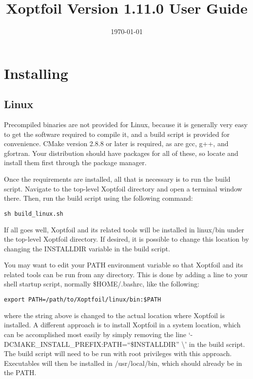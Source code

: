 \documentclass[11pt]{article}
\begin{document}
\title{Xoptfoil Version 1.11.0 User Guide}
\date{\today}
\maketitle

\tableofcontents

\section{Installing}\label{sec:installing}

\subsection{Linux}\label{sec:build_linux}

Precompiled binaries are not provided for Linux, because it is
generally very easy to get the software required to compile it, and a build script is
provided for convenience. CMake version 2.8.8 or later is required, as are gcc, g++, and
gfortran. Your distribution should have packages for all of these, so locate and install
them first through the package manager.

Once the requirements are installed, all that is necessary is to run the build script.
Navigate to the top-level Xoptfoil directory and open a terminal window there. Then, run
the build script using the following command:

\begin{verbatim}
sh build_linux.sh
\end{verbatim}

If all goes well, Xoptfoil and its related tools will be installed in linux/bin under the
top-level Xoptfoil directory. If desired, it is possible to change this location by
changing the INSTALLDIR variable in the build script.

You may want to edit your PATH environment variable so that Xoptfoil and its related tools
can be run from any directory. This is done by adding a line to your shell startup script,
normally \$HOME/.bashrc, like the following:

\begin{verbatim}
export PATH=/path/to/Xoptfoil/linux/bin:$PATH
\end{verbatim}

\noindent where the string above is changed to the actual location where Xoptfoil is
installed. A different approach is to install Xoptfoil in a system location, which can be
accomplished most easily by simply removing the line
`-DCMAKE\_INSTALL\_PREFIX:PATH=``\$INSTALLDIR'' \textbackslash' in the build script. The
build script will need to be run with root privileges with this approach. Executables will
then be installed in /usr/local/bin, which should already be in the PATH.
\end{document}
